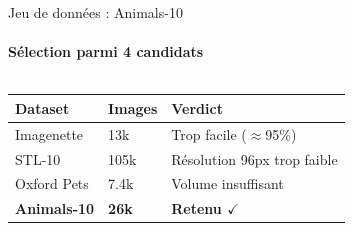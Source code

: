 \documentclass[aspectratio=169, 10pt]{beamer}
\begin{document}
\begin{frame}{Jeu de donn\'{e}es : Animals-10}
  \framesubtitle{S\'{e}lection parmi 4 candidats}
  \footnotesize
  \begin{columns}[T]
    \begin{column}{0.57\textwidth}
      \renewcommand{\arraystretch}{1.35}
      \begin{tabular}{@{}lC{1.2cm}L{3.5cm}@{}}
        \toprule
        \color{primary}\textbf{Dataset} & \color{primary}\textbf{Images} & \color{primary}\textbf{Verdict} \\
        \midrule
        Imagenette  & 13k   & Trop facile ($\approx$95\%) \\
        STL-10      & 105k  & R\'{e}solution 96px trop faible \\
        Oxford Pets & 7.4k  & Volume insuffisant \\
        \textbf{Animals-10} & \textbf{26k} & \textbf{\color{success}Retenu $\checkmark$} \\
        \bottomrule
      \end{tabular}


\end{column}
\end{columns}
\end{frame}
\end{document}
